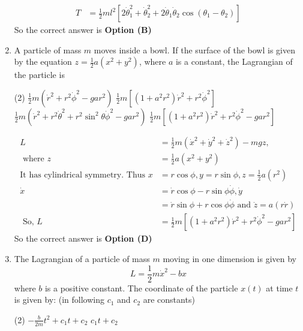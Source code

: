 \begin{enumerate}
\begin{answer}
\begin{align*}
	T&=\frac{1}{2} m l^{2}\left[2 \dot{\theta}_{1}^{2}+\dot{\theta}_{2}^{2}+2 \dot{\theta}_{1} \dot{\theta}_{2} \cos \left(\theta_{1}-\theta_{2}\right)\right]
	\end{align*}
	So the correct answer is \textbf{Option (B)}
\end{answer}
	\item A particle of mass $m$ moves inside a bowl. If the surface of the bowl is given by the equation $z=\frac{1}{2} a\left(x^{2}+y^{2}\right)$, where $a$ is a constant, the Lagrangian of the particle is
	{}
	\begin{tasks}(2)
		\task[\textbf{A.}] $\frac{1}{2} m\left(\dot{r}^{2}+r^{2} \dot{\phi}^{2}-g a r^{2}\right)$
		\task[\textbf{B.}] $\frac{1}{2} m\left[\left(1+a^{2} r^{2}\right) \dot{r}^{2}+r^{2} \dot{\phi}^{2}\right]$
		\task[\textbf{C.}]  $\frac{1}{2} m\left(\dot{r}^{2}+r^{2} \dot{\theta}^{2}+r^{2} \sin ^{2} \theta \dot{\phi}^{2}-g a r^{2}\right)$
		\task[\textbf{D.}]  $\frac{1}{2} m\left[\left(1+a^{2} r^{2}\right) \dot{r}^{2}+r^{2} \dot{\phi}^{2}-g a r^{2}\right]$
	\end{tasks}
\begin{answer}
	\begin{align*}
	L&=\frac{1}{2} m\left(\dot{x}^{2}+\dot{y}^{2}+\dot{z}^{2}\right)-m g z,\\\text{ where } z&=\frac{1}{2} a\left(x^{2}+y^{2}\right)\\
	\text{It has cylindrical symmetry. Thus }x&=r \cos \phi, y=r \sin \phi, z=\frac{1}{2} a\left(r^{2}\right)\\
	\dot{x}&=\dot{r} \cos \phi-r \sin \phi \dot{\phi}, \dot{y}\\&=\dot{r} \sin \phi+r \cos \phi \dot{\phi}\text{ and }\dot{z}=a(r \dot{r})\\
	\text{	So, }L&=\frac{1}{2} m\left[\left(1+a^{2} r^{2}\right) \dot{r}^{2}+r^{2} \dot{\phi}^{2}-g a r^{2}\right]
	\end{align*}
	So the correct answer is \textbf{Option (D)}
\end{answer}
	\item The Lagrangian of a particle of mass $m$ moving in one dimension is given by
	$$
	L=\frac{1}{2} m \dot{x}^{2}-b x
	$$
	where $b$ is a positive constant. The coordinate of the particle $x(t)$ at time $t$ is given by: (in following $c_{1}$ and $c_{2}$ are constants)
	{}
	\begin{tasks}(2)
		\task[\textbf{A.}] $-\frac{b}{2 m} t^{2}+c_{1} t+c_{2}$
		\task[\textbf{B.}] $c_{1} t+c_{2}$

\end{tasks}
\end{enumerate}
